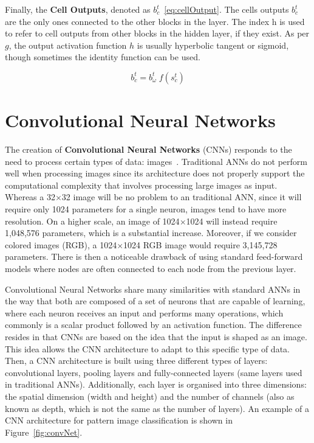 Finally, the \textbf{Cell Outputs}, denoted as $b_c^t$~\ref{eq:cellOutput}. The cells outputs $b_c^t$ 
are the only ones connected to the other blocks in the layer. The index h is used to refer 
to cell outputs from other blocks in the hidden layer, if they exist. As per $g$, the output 
activation function $h$ is usually hyperbolic tangent or sigmoid, though sometimes the 
identity function can be used. 

\begin{equation} \label{eq:cellOutput}
    b_c^t = b_\omega^t \; f(s_c^t)
\end{equation}


\section{Convolutional Neural Networks}
\label{appendix:neuralNetworks/cnn}
The creation of \textbf{Convolutional Neural Networks} (CNNs) responds to the need to process 
certain types of data: images~\cite{appendix:OSheaN15}. Traditional ANNs do not perform well 
when processing images since its architecture does not properly support the computational 
complexity that involves processing large images as input. Whereas a 32$\times$32 image will 
be no problem to an traditional ANN, since it will require only 1024 parameters for a single 
neuron, images tend to have more resolution. On a higher scale, an image of 1024$\times$1024 
will instead require 1,048,576 parameters, which is a substantial increase. Moreover, if we 
consider colored images (RGB), a 1024$\times$1024 RGB image would require 3,145,728 
parameters. There is then a noticeable drawback of using standard feed-forward models where 
nodes are often connected to each node from the previous layer.

Convolutional Neural Networks share many similarities with standard ANNs in the way that both 
are composed of a set of neurons that are capable of learning, where each neuron receives an 
input and performs many operations, which commonly is a scalar product followed by an 
activation function. The difference resides in that CNNs are based on the idea that the input 
is shaped as an image. This idea allows the CNN architecture to adapt to this specific type 
of data. Then, a CNN architecture is built using three different types of layers: 
convolutional layers, pooling layers and fully-connected layers (same layers used in 
traditional ANNs). Additionally, each layer is organised into three dimensions: the spatial 
dimension (width and height) and the number of channels (also as known as depth, which is not 
the same as the number of layers). An example of a CNN architecture for pattern image 
classification is shown in Figure~\ref{fig:convNet}.

